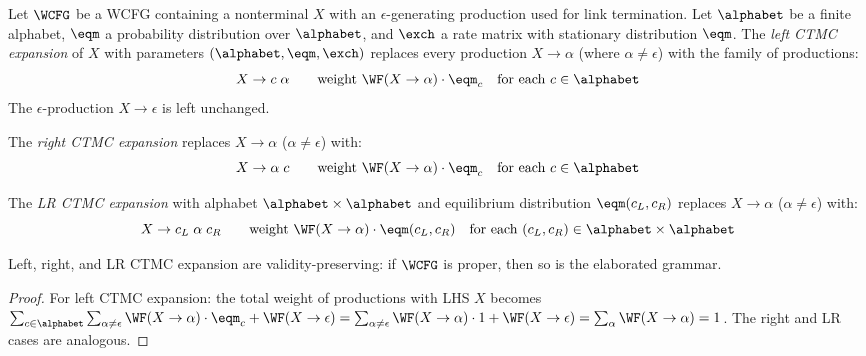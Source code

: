 \begin{definition}
\label{def:ctmc-appendix}
Let $\WCFG$ be a WCFG containing a nonterminal $X$ with an
$\epsilon$-generating production used for link termination.
Let $\alphabet$ be a finite alphabet, $\eqm$ a probability distribution
over $\alphabet$, and $\exch$ a rate matrix with stationary distribution $\eqm$.
The \emph{left CTMC expansion} of $X$ with parameters $(\alphabet, \eqm, \exch)$
replaces every production $X \to \alpha$ (where $\alpha \neq \epsilon$)
with the family of productions:
\begin{equation}
X \to c\;\alpha \qquad \text{weight } \WF(X \to \alpha) \cdot \eqm_c
\quad \text{for each } c \in \alphabet
\end{equation}
The $\epsilon$-production $X \to \epsilon$ is left unchanged.

The \emph{right CTMC expansion} replaces $X \to \alpha$ ($\alpha \neq \epsilon$) with:
\begin{equation}
X \to \alpha\;c \qquad \text{weight } \WF(X \to \alpha) \cdot \eqm_c
\quad \text{for each } c \in \alphabet
\end{equation}

The \emph{LR CTMC expansion} with alphabet $\alphabet \times \alphabet$
and equilibrium distribution $\eqm(c_L, c_R)$ replaces
$X \to \alpha$ ($\alpha \neq \epsilon$) with:
\begin{equation}
X \to c_L\;\alpha\;c_R \qquad \text{weight } \WF(X \to \alpha) \cdot \eqm(c_L, c_R)
\quad \text{for each } (c_L, c_R) \in \alphabet \times \alphabet
\end{equation}
\end{definition}

\begin{proposition}
Left, right, and LR CTMC expansion are validity-preserving:
if $\WCFG$ is proper, then so is the elaborated grammar.
\end{proposition}

\begin{proof}
For left CTMC expansion: the total weight of productions with
LHS $X$ becomes
$\sum_{c \in \alphabet} \sum_{\alpha \neq \epsilon} \WF(X \to \alpha) \cdot \eqm_c
+ \WF(X \to \epsilon)
= \sum_{\alpha \neq \epsilon} \WF(X \to \alpha) \cdot 1 + \WF(X \to \epsilon)
= \sum_\alpha \WF(X \to \alpha) = 1$.
The right and LR cases are analogous.
\end{proof}

